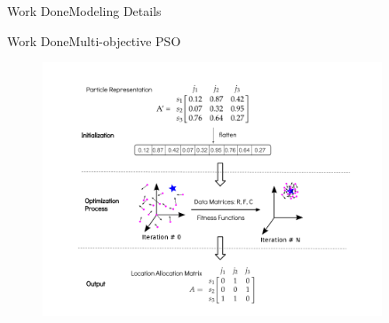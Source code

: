 \documentclass[10pt]{beamer}
\newcommand{\chref}[2]{
  \href{#1}{{\usebeamercolor[bg]{Feather}#2}}
}
\begin{document}
\begin{frame}{Work Done}{Modeling Details}
\hfill





\end{frame}


\begin{frame}{Work Done}{Multi-objective PSO}

\begin{figure}
	\includegraphics[width=0.9\textwidth]{./Feathergraphics/pso.png}
\end{figure}
\end{frame}

\end{document}
